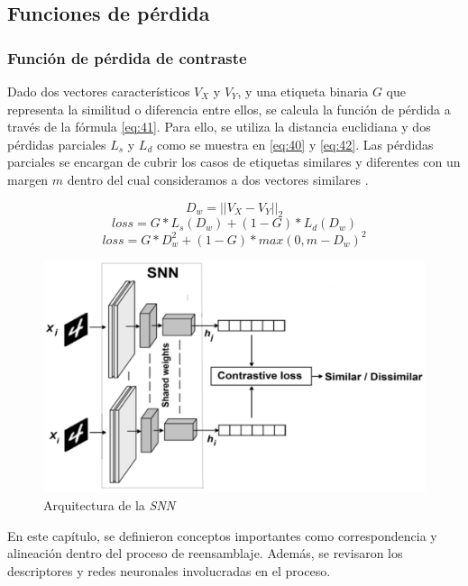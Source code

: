 \subsection{Funciones de pérdida}  \label{section:contrastive}
\subsubsection{Función de pérdida de contraste}
Dado dos vectores característicos $V_X$ y $V_Y$, y una etiqueta binaria $G$ que representa la similitud o diferencia entre ellos, se calcula la función de pérdida a través de la fórmula \ref{eq:41}. Para ello, se utiliza la distancia euclidiana y dos pérdidas parciales $L_s$ y $L_d$ como se muestra en \ref{eq:40} y \ref{eq:42}. Las pérdidas parciales se encargan de cubrir los casos de etiquetas similares y diferentes con un margen $m$ dentro del cual consideramos a dos vectores similares \cite{19}. 

\begin{equation} \label{eq:40}
    D_w = ||V_{X} - V_{Y}||_2
\end{equation}
\begin{equation} \label{eq:42}
    loss = G * L_s(D_w) + (1 - G) * L_d(D_w) 
\end{equation}
\begin{equation} \label{eq:41}
    loss = G * D_w^2 + (1 - G) * max(0, m - D_w)^2
\end{equation}

\begin{figure}[!h]
    \centering
     \includegraphics[scale=0.17]{images/snn.png}
    \caption{Arquitectura de la \textit{SNN} \cite{15}}
    \label{fig:snn}
\end{figure}


\hfill \break
\indent En este capítulo, se definieron conceptos importantes como correspondencia y alineación dentro del proceso de reensamblaje. Además, se revisaron los descriptores y redes neuronales involucradas en el proceso.
